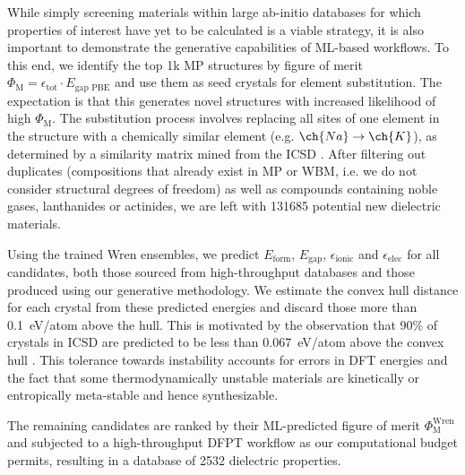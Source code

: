 \documentclass{article}
\newcommand{\fom}[1][]{\Phi_\text{M#1}}
\newcommand{\egap}{{E_\text{gap}}}
\newcommand{\eform}{E_\text{form}}
\newcommand{\epstot}{\epsilon_\text{tot}}
\newcommand{\epsionic}{\epsilon_\text{ionic}}
\newcommand{\epselec}{\epsilon_\text{elec}}
\begin{document}
While simply screening materials within large ab-initio databases for which properties of interest have yet to be calculated is a viable strategy, it is also important to demonstrate the generative capabilities of ML-based workflows.
To this end, we identify the top 1k MP structures by figure of merit $\fom = \epstot \cdot E_\text{gap\ PBE}$ and use them as seed crystals for element substitution.
The expectation is that this generates novel structures with increased likelihood of high $\fom$.
The substitution process involves replacing all sites of one element in the structure with a chemically similar element (e.g. $\ch{Na} \to \ch{K}$), as determined by a similarity matrix mined from the ICSD \cite{bergerhoff_inorganic_1983}.
After filtering out duplicates (compositions that already exist in MP or WBM, i.e. we do not consider structural degrees of freedom) as well as compounds containing noble gases, lanthanides or actinides, we are left with \num{131685} potential new dielectric materials.

Using the trained Wren ensembles, we predict $\eform$, $\egap$, $\epsionic$ and $\epselec$ for all candidates, both those sourced from high-throughput databases and those produced using our generative methodology.
We estimate the convex hull distance for each crystal from these predicted energies and discard those more than \SI{0.1}{eV/atom} above the hull.
This is motivated by the observation that 90\% of crystals in ICSD are predicted to be less than \SI{0.067}{eV/atom} above the convex hull \cite{sun_thermodynamic_2016}.
This tolerance towards instability accounts for errors in DFT energies and the fact that some thermodynamically unstable materials are kinetically or entropically meta-stable and hence synthesizable.

The remaining candidates are ranked by their ML-predicted figure of merit $\fom^\text{Wren}$ and subjected to a high-throughput DFPT workflow as our computational budget permits, resulting in a database of \num{2532} dielectric properties.
\end{document}
